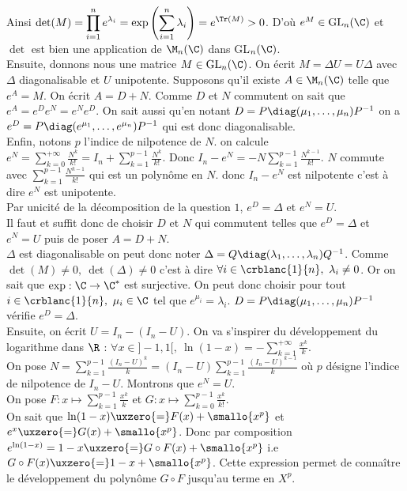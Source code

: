 \documentclass[8pt]{book}
\begin{document}
\begin{enumerate}[leftmargin=*]
		Ainsi $\det(M)=\displaystyle\prod_{i=1}^ne^{\lambda_i}=\exp\left(\sum_{i=1}^n\lambda_i\right)=e^{\Tr(M)}>0$. D'où $e^M\in \text{GL}_n(\C)$ et $\det$ est bien une application de $\M_n(\C)$ dans GL$_n(\C)$.\\
		Ensuite, donnons nous une matrice $M\in \text{GL}_n(\C)$. On écrit $M=\Delta U=U\Delta$ avec $\Delta$ diagonalisable et $U$ unipotente. Supposons qu'il existe $A\in \M_n(\C)$ telle que $e^A=M$. On écrit $A=D+N$. Comme $D$ et $N$ commutent on sait que $e^A=e^De^N=e^Ne^D$. On sait aussi qu'en notant $D=P\diag(\mu_1,\dots,\mu_n)P^{-1}$ on a $e^D=P\diag(e^{\mu_1},\dots,e^{\mu_n})P^{-1}$ qui est donc diagonalisable.\\
		Enfin, notons $p$ l'indice de nilpotence de $N$. on calcule $e^N=\displaystyle\sum_{k=0}^{+\infty}\frac{N^k}{k!}=I_n+\sum_{k=1}^{p-1}\frac{N^k}{k!}$. Donc $I_n-e^N=-N\displaystyle\sum_{k=1}^{p-1}\frac{N^{k-1}}{k!}$. $N$ commute avec $\displaystyle\sum_{k=1}^{p-1}\frac{N^{k-1}}{k!}$ qui est un polynôme en $N$. donc $I_n-e^N$ est nilpotente c'est à dire $e^N$ est unipotente.\\
		Par unicité de la décomposition de la question $1$, $e^D=\Delta$ et $e^N=U$.\\
		Il faut et suffit donc de choisir $D$ et $N$ qui commutent telles que $e^D=\Delta$ et $e^N=U$ puis de poser $A=D+N$.\\
		$\Delta$ est diagonalisable on peut donc noter $\Delta=Q\diag(\lambda_1,\dots,\lambda_n)Q^{-1}$. Comme $\det(M)\ne 0,\ \det(\Delta)\ne 0$ c'est à dire $\forall i\in \crblanc{1}{n},\ \lambda_i\ne 0$. Or on sait que $\exp:\C\to\C^*$ est surjective. On peut donc choisir pour tout $i\in \crblanc{1}{n},\ \mu_i\in \C$ tel que $e^{\mu_i}=\lambda_i$. $D=P\diag(\mu_1,\dots,\mu_n)P^{-1}$ vérifie $e^D=\Delta$.\\
		Ensuite, on écrit $U=I_n-(I_n-U)$. On va s'inspirer du développement du logarithme dans $\R$ : $\forall x\in ]-1,1[,\ \ln(1-x)=-\displaystyle\sum_{k=1}^{+\infty}\frac{x^k}{k}$.\\
		On pose $N=\displaystyle\sum_{k=1}^{p-1}\frac{(I_n-U)^k}{k}=(I_n-U)\displaystyle\sum_{k=1}^{p-1}\frac{(I_n-U)^{k-1}}{k}$ où $p$ désigne l'indice de nilpotence de $I_n-U$. Montrons que $e^N=U$.\\
		On pose $F:x\mapsto \displaystyle\sum_{k=1}^{p-1}\frac{x^k}{k}$ et $G:x\mapsto \displaystyle\sum_{k=0}^{p-1}\frac{x^k}{k!}$.\\
		On sait que $\ln(1-x)\uxzero{=}F(x)+\smallo{x^p}$ et $e^x\uxzero{=}G(x)+\smallo{x^p}$. Donc par composition $e^{\ln(1-x)}=1-x\uxzero{=}G\circ F(x)+\smallo{x^p}$ i.e $G\circ F(x)\uxzero{=}1-x+\smallo{x^p}$. Cette expression permet de connaître le développement du polynôme $G\circ F$ jusqu'au terme en $X^p$.\\

\end{enumerate}
\end{document}
